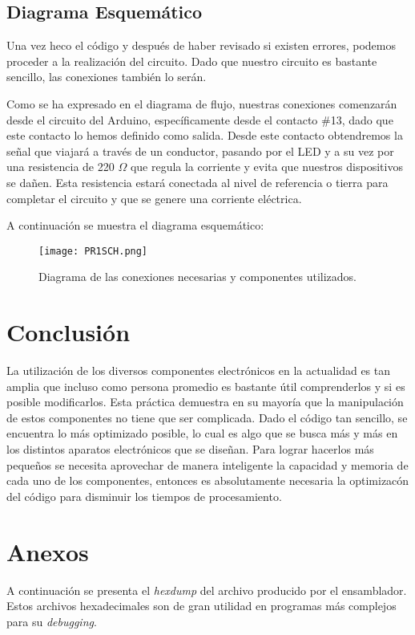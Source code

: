 \documentclass[12pt, letterpaper]{article}
\begin{document}
\subsection*{Diagrama Esquemático}
Una vez heco el código y después de haber revisado si existen errores, podemos proceder a la realización del circuito. Dado que nuestro circuito es bastante sencillo, las conexiones también lo serán.

Como se ha expresado en el diagrama de flujo, nuestras conexiones comenzarán desde el circuito del Arduino, específicamente desde el contacto \#13, dado que este contacto lo hemos definido como salida. Desde este contacto obtendremos la señal que viajará a través de un conductor, pasando por el LED y a su vez por una resistencia de 220 $\Omega$ que regula la corriente y evita que nuestros dispositivos se dañen. Esta resistencia estará conectada al nivel de referencia o tierra para completar el circuito y que se genere una corriente eléctrica.

A continuación se muestra el diagrama esquemático:

\begin{figure}[H]
	\centering
	\texttt{[image: PR1SCH.png]}
	\caption{Diagrama de las conexiones necesarias y componentes utilizados.}
\end{figure}

\section*{Conclusión}

La utilización de los diversos componentes electrónicos en la actualidad es tan amplia que incluso como persona promedio es bastante útil comprenderlos y si es posible modificarlos. Esta práctica demuestra en su mayoría que la manipulación de estos componentes no tiene que ser complicada. Dado el código tan sencillo, se encuentra lo más optimizado posible, lo cual es algo que se busca más y más en los distintos aparatos electrónicos que se diseñan. Para lograr hacerlos más pequeños se necesita aprovechar de manera inteligente la capacidad y memoria de cada uno de los componentes, entonces es absolutamente necesaria la optimizacón del código para disminuir los tiempos de procesamiento.

\section*{Anexos}
A continuación se presenta el \textit{hexdump} del archivo producido por el ensamblador. Estos archivos hexadecimales son de gran utilidad en programas más complejos para su \textit{debugging}.

\scriptsize


\renewcommand\refname{References}
\printbibliography
\end{document}
